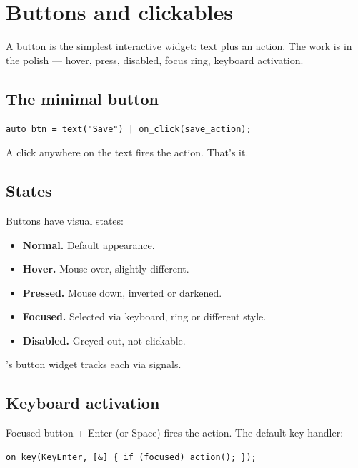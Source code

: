 \chapter{Buttons and clickables}
\label{ch:buttons}

\begin{aside}
A button is the simplest interactive widget: text plus an
action. The work is in the polish --- hover, press, disabled,
focus ring, keyboard activation.
\end{aside}

\section{The minimal button}

\begin{lstlisting}
auto btn = text("Save") | on_click(save_action);
\end{lstlisting}

A click anywhere on the text fires the action. That's it.

\section{States}

Buttons have visual states:

\begin{itemize}[leftmargin=*]
  \item \textbf{Normal.} Default appearance.
  \item \textbf{Hover.} Mouse over, slightly different.
  \item \textbf{Pressed.} Mouse down, inverted or
    darkened.
  \item \textbf{Focused.} Selected via keyboard, ring or
    different style.
  \item \textbf{Disabled.} Greyed out, not clickable.
\end{itemize}

\maya{}'s button widget tracks each via signals.

\section{Keyboard activation}

Focused button + Enter (or Space) fires the action. The
default key handler:

\begin{lstlisting}
on_key(KeyEnter, [&] { if (focused) action(); });
\end{lstlisting}


